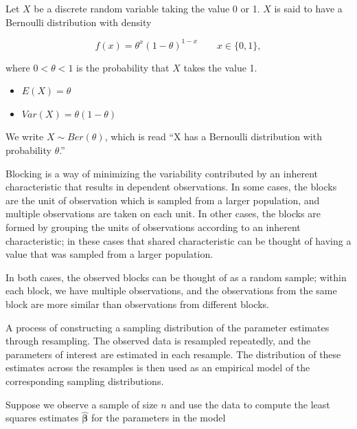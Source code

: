 \documentclass[
  letterpaper,
  DIV=11,
  numbers=noendperiod]{scrreprt}
\providecommand{\tightlist}{%
  \setlength{\itemsep}{0pt}\setlength{\parskip}{0pt}}\usepackage{longtable,booktabs,array}
\theoremstyle{definition}
\theoremstyle{definition}
\theoremstyle{remark}
\begin{document}
\begin{description}
\tightlist
\item[Bernoulli Distribution
(Definition~\ref{def-bernoulli-distribution})]
Let \(X\) be a discrete random variable taking the value 0 or 1. \(X\)
is said to have a Bernoulli distribution with density
\end{description}

\[f(x) = \theta^x (1 - \theta)^{1 - x} \qquad x \in \{0, 1\},\]

where \(0 < \theta < 1\) is the probability that \(X\) takes the value
1.

\begin{itemize}
\tightlist
\item
  \(E(X) = \theta\)
\item
  \(Var(X) = \theta(1 - \theta)\)
\end{itemize}

We write \(X \sim Ber(\theta)\), which is read ``X has a Bernoulli
distribution with probability \(\theta\).''

\begin{description}
\tightlist
\item[Blocking (Definition~\ref{def-blocking})]
Blocking is a way of minimizing the variability contributed by an
inherent characteristic that results in dependent observations. In some
cases, the blocks are the unit of observation which is sampled from a
larger population, and multiple observations are taken on each unit. In
other cases, the blocks are formed by grouping the units of observations
according to an inherent characteristic; in these cases that shared
characteristic can be thought of having a value that was sampled from a
larger population.
\end{description}

In both cases, the observed blocks can be thought of as a random sample;
within each block, we have multiple observations, and the observations
from the same block are more similar than observations from different
blocks.

\begin{description}
\tightlist
\item[Bootstrapping (Definition~\ref{def-bootstrapping})]
A process of constructing a sampling distribution of the parameter
estimates through resampling. The observed data is resampled repeatedly,
and the parameters of interest are estimated in each resample. The
distribution of these estimates across the resamples is then used as an
empirical model of the corresponding sampling distributions.
\item[Case Resampling Bootstrap
(Definition~\ref{def-case-resampling-bootstrap})]
Suppose we observe a sample of size \(n\) and use the data to compute
the least squares estimates \(\widehat{\boldsymbol{\beta}}\) for the
parameters in the model
\end{description}
\end{document}
